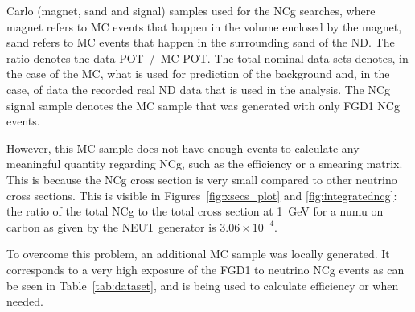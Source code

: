 \begin{table}[ht]
{    Carlo (magnet, sand and signal) samples used for the \Gls{NCg}
    searches, where \gls{magnet} refers to \Gls{MC} events that happen
    in the volume enclosed by the magnet, \gls{sand} refers to
    \Gls{MC} events that happen in the surrounding sand of the
    \Gls{ND}. The ratio denotes the data \Gls{POT}~/~\Gls{MC}
    \Gls{POT}. The total nominal data sets denotes, in the case of the
    \Gls{MC}, what is used for prediction of the background and, in
    the case, of data the recorded real \Gls{ND} data that is used in
    the analysis. The \Gls{NCg} signal sample denotes the \Gls{MC}
    sample that was generated with only \Gls{FGD}1 \Gls{NCg} events.}
  \label{tab:dataset}
\end{table}


However, this \Gls{MC} sample does not have enough events to calculate
any meaningful quantity regarding \Gls{NCg}, such as the efficiency or
a smearing matrix. This is because the \Gls{NCg} cross section is very
small compared to other neutrino cross sections. This is visible in
Figures~\ref{fig:xsecs_plot} and \ref{fig:integratedncg}: the ratio of
the total \Gls{NCg} to the total cross section at 1~GeV for a
\Gls{numu} on carbon as given by the \Gls{NEUT} generator is
$3.06\times10^{-4}$.

To overcome this problem, an additional \Gls{MC} sample was locally
generated. It corresponds to a very high exposure of the \Gls{FGD}1 to
neutrino \Gls{NCg} events as can be seen in Table~\ref{tab:dataset},
and is being used to calculate efficiency or when needed.

